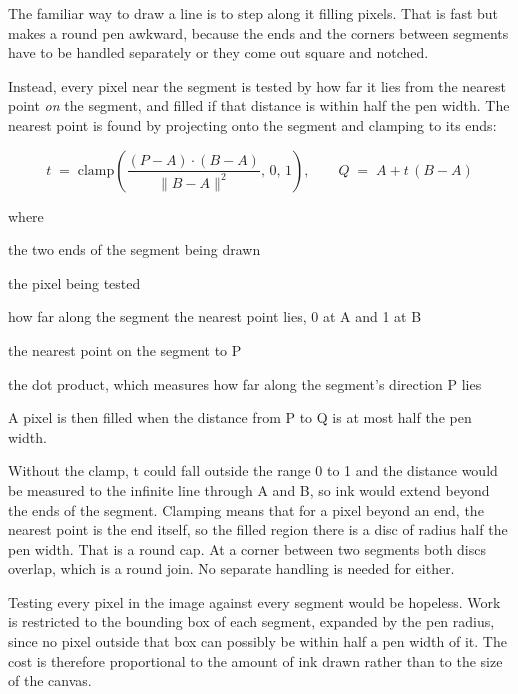 The familiar way to draw a line is to step along it filling pixels. That is fast but makes a round pen awkward, because the ends and the corners between segments have to be handled separately or they come out square and notched.

Instead, every pixel near the segment is tested by how far it lies from the nearest point \emph{on} the segment, and filled if that distance is within half the pen width. The nearest point is found by projecting onto the segment and clamping to its ends:


\begin{equation}
t \;=\; \mathrm{clamp}\!\left(\frac{(P-A)\cdot(B-A)}{\lVert B-A \rVert^2},\, 0,\, 1\right), \qquad Q \;=\; A + t\,(B-A)
\end{equation}

\noindent where
\begin{description}[leftmargin=2.4em,style=nextline,font=\normalfont\ttfamily]\setlength\itemsep{1pt}
  \item[{$A,\, B$}] \normalfont the two ends of the segment being drawn
  \item[{$P$}] \normalfont the pixel being tested
  \item[{$t$}] \normalfont how far along the segment the nearest point lies, 0 at A and 1 at B
  \item[{$Q$}] \normalfont the nearest point on the segment to P
  \item[{$(P-A)\cdot(B-A)$}] \normalfont the dot product, which measures how far along the segment's direction P lies
\end{description}
A pixel is then filled when the distance from P to Q is at most half the pen width.


Without the clamp, t could fall outside the range 0 to 1 and the distance would be measured to the infinite line through A and B, so ink would extend beyond the ends of the segment. Clamping means that for a pixel beyond an end, the nearest point is the end itself, so the filled region there is a disc of radius half the pen width. That is a round cap. At a corner between two segments both discs overlap, which is a round join. No separate handling is needed for either.


Testing every pixel in the image against every segment would be hopeless. Work is restricted to the bounding box of each segment, expanded by the pen radius, since no pixel outside that box can possibly be within half a pen width of it. The cost is therefore proportional to the amount of ink drawn rather than to the size of the canvas.

